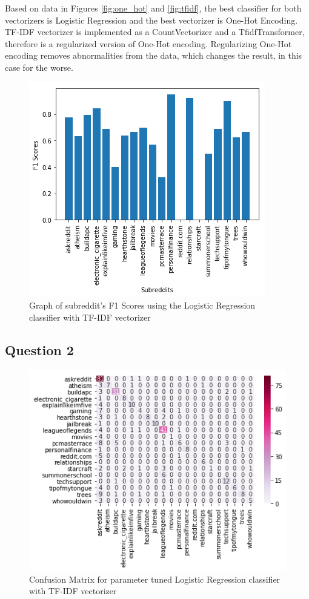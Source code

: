 \documentclass[10pt, a4paper]{article}
\begin{document}
Based on data in Figures \ref{fig:one_hot} and \ref{fig:tfidf}, the best classifier for both vectorizers is Logistic Regression
and the best vectorizer is One-Hot Encoding.
TF-IDF vectorizer is implemented as a CountVectorizer and a TfidfTransformer, therefore is a regularized version of One-Hot encoding.
Regularizing One-Hot encoding removes abnormalities from the data, which changes the result, in this case for the worse.


\begin{figure}[H]
	\caption{Graph of subreddit's F1 Scores using the Logistic Regression classifier with TF-IDF vectorizer}
	\begin{center}
		\includegraphics[width=.7\linewidth]{q1_one_graph}
	\end{center}
	\label{fig:f1_graph}
\end{figure}

\subsection{Question 2}
\begin{figure}[H]
	\caption{Confusion Matrix for parameter tuned Logistic Regression classifier with TF-IDF vectorizer}
	\begin{center}
		\includegraphics[width=.6\linewidth]{q2_mat}
	\end{center}
	\label{fig:tune_mat}
\end{figure}
\end{document}
